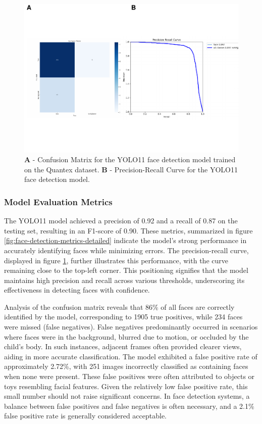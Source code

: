 \documentclass[
  man,floatsintext]{apa6}
\begin{document}
\begin{figure}

{\centering \includegraphics{Quantex_interaction_paper_files/figure-latex/person-metrics-1} 

}

\caption{\textbf{A} - Confusion Matrix for the YOLO11 face detection model trained on the Quantex dataset. \textbf{B} - Precision-Recall Curve for the YOLO11 face detection model.}\label{fig:person-metrics}
\end{figure}

\subsubsection{Model Evaluation Metrics}\label{model-evaluation-metrics}

The YOLO11 model achieved a precision of 0.92 and a recall of 0.87 on the testing set, resulting in an F1-score of 0.90. These metrics, summarized in figure \ref{fig:face-detection-metrics-detailed} indicate the model's strong performance in accurately identifying faces while minimizing errors. The precision-recall curve, displayed in figure \ref{fig:person-metrics}, further illustrates this performance, with the curve remaining close to the top-left corner. This positioning signifies that the model maintains high precision and recall across various thresholds, underscoring its effectiveness in detecting faces with confidence.

Analysis of the confusion matrix reveals that 86\% of all faces are correctly identified by the model, corresponding to 1905 true positives, while 234 faces were missed (false negatives). False negatives predominantly occurred in scenarios where faces were in the background, blurred due to motion, or occluded by the child's body. In such instances, adjacent frames often provided clearer views, aiding in more accurate classification. The model exhibited a false positive rate of approximately 2.72\%, with 251 images incorrectly classified as containing faces when none were present. These false positives were often attributed to objects or toys resembling facial features. Given the relatively low false positive rate, this small number should not raise significant concerns. In face detection systems, a balance between false positives and false negatives is often necessary, and a 2.1\% false positive rate is generally considered acceptable.
\end{document}
